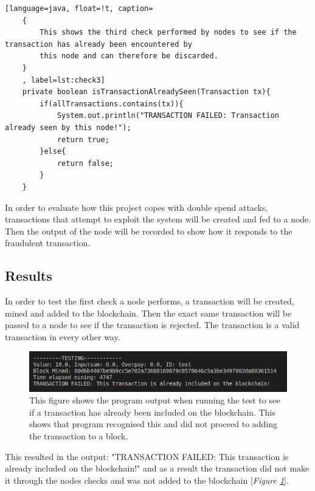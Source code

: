 \documentclass{l4proj}
\begin{document}
\begin{lstlisting}[language=java, float=!t, caption=
    {
        This shows the third check performed by nodes to see if the transaction has already been encountered by
        this node and can therefore be discarded.
    }
    , label=lst:check3]
    private boolean isTransactionAlreadySeen(Transaction tx){
        if(allTransactions.contains(tx)){
            System.out.println("TRANSACTION FAILED: Transaction already seen by this node!");
            return true;
        }else{
            return false;
        }
    }
\end{lstlisting}

In order to evaluate how this project copes with double spend attacks, transactions that attempt to exploit the system
will be created and fed to a node. Then the output of the node will be recorded to show how it responds to the fraudulent
transaction.

\subsection{Results}
In order to test the first check a node performs, a transaction will be created, mined and added to the blockchain.
Then the exact same transaction will be passed to a node to see if the transaction is rejected. The transaction is
a valid transaction in every other way.

\begin{figure}[!ht]
    \centering
    \includegraphics[width=1\linewidth]{images/check1.png}    
    \caption
    {
        This figure shows the program output when running the test to see if a transaction has already been included
        on the blockchain. This shows that program recognised this and did not proceed to adding the transaction to a 
        block.
    }
    \label{fig:check1} 
\end{figure}

This resulted in the output: "TRANSACTION FAILED: This transaction is already included on the blockchain!" and as
a result the transaction did not make it through the nodes checks and was not added to the blockchain [\textit{Figure \ref{fig:check1}}].
\end{document}
